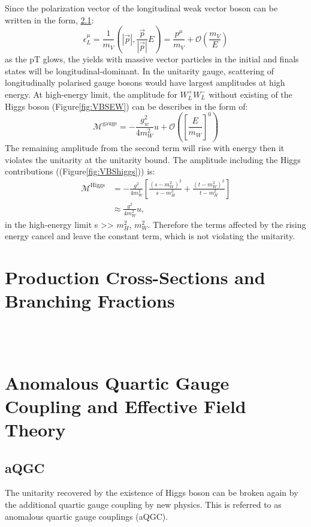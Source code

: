 Since the polarization vector of the longitudinal weak vector boson can be written in the form, \ref{}: %
\begin{equation}
\epsilon_{L}^{\mu}=\frac{1}{m_{V}}\left(|\vec{p}|, \frac{\vec{p}}{|\vec{p}|} E\right)=\frac{p^{\mu}}{m_{V}}+\mathcal{O}\left(\frac{m_{V}}{E}\right)
\end{equation}
as the pT glows, the yields with massive vector particles in the initial and finals states will be longitudinal-dominant.
In the unitarity gauge, scattering of longitudinally polarised gauge bosons would have largest amplitudes at high energy. At high-energy limit, the amplitude for $W_L^+W_L^-$ without existing of the Higgs boson (Figure\ref{fig:VBSEW}) can be describes in the form of:
\begin{equation}
\mathcal{M}^{\text {gauge}}=-\frac{g_{w}^{2}}{4 m_{W}^{2}} u+\mathcal{O}\left(\left[\frac{E}{m_{W}}\right]^{0}\right)
\end{equation}
The remaining amplitude from the second term will rise with energy then it violates the unitarity at the unitarity bound. The amplitude including the Higgs contributions ((Figure\ref{fig:VBShiggs})) is:
\begin{equation}
\begin{aligned}
\mathcal{M}^{\text {Higgs}} &=-\frac{g^{2}}{4 m_{W}^{2}}\left[\frac{\left(s-m_{W}^{2}\right)^{2}}{s-m_{H}^{2}}+\frac{\left(t-m_{W}^{2}\right)^{2}}{t-m_{H}^{2}}\right] \\
& \approx \frac{g^{2}}{4 m_{W}^{2}} u,
\end{aligned}
\end{equation}
in the high-energy limit s >> $m_{H}^{2}$, $m_{W}^{2}$.
Therefore the terms affected by the rising energy cancel and leave the constant term, which is not violating the unitarity.

\section{Production Cross-Sections and Branching Fractions}
\\
\\

\section{Anomalous Quartic Gauge Coupling and Effective Field Theory}

\subsection{aQGC}
The unitarity recovered by the existence of Higgs boson can be broken again by the additional quartic gauge coupling by new physics. This is referred to as anomalous quartic gauge couplings (aQGC). 

